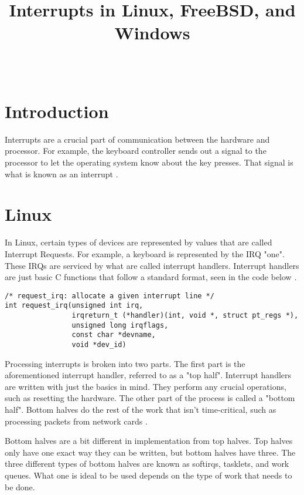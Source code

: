 \documentclass[10pt,draftclsnofoot,onecolumn,journal,compsoc]{IEEEtran}
\title{Interrupts in Linux, FreeBSD, and Windows}
\author{
  \IEEEauthorblockN{Heidi Clayton} \\
  \IEEEauthorblockA{CS 444: Operating Systems II Spring 2017 \\ Oregon State University}
}
\begin{document}
\maketitle
\newpage
\tableofcontents
\newpage
\section{Introduction}
Interrupts are a crucial part of communication between the hardware and processor. For example, the keyboard controller sends out a signal to the processor to let the operating system know about the key presses. That signal is what is known as an interrupt \cite{linux}.

\section{Linux}
 In Linux, certain types of devices are represented by values that are called Interrupt Requests. For example, a keyboard is represented by the IRQ "one". These IRQs are serviced by what are called interrupt handlers. Interrupt handlers are just basic C functions that follow a standard format, seen in the code below \cite{linux}.
 
\begin{lstlisting}[caption={The \textit{request\_irq} prototype in the linux/interrupt.h file. Note that the \textit{handler} parameter is a function pointer to the interrupt handler.}]
/* request_irq: allocate a given interrupt line */
int request_irq(unsigned int irq,
                irqreturn_t (*handler)(int, void *, struct pt_regs *),
                unsigned long irqflags,
                const char *devname,
                void *dev_id)
\end{lstlisting}
Processing interrupts is broken into two parts. The first part is the aforementioned interrupt handler, referred to as a "top half". Interrupt handlers are written with just the basics in mind. They perform any crucial operations, such as resetting the hardware. The other part of the process is called a "bottom half". Bottom halves do the rest of the work that isn't time-critical, such as processing packets from network cards \cite{linux}. 

Bottom halves are a bit different in implementation from top halves. Top halves only have one exact way they can be written, but bottom halves have three. The three different types of bottom halves are known as softirqs, tasklets, and work queues. What one is ideal to be used depends on the type of work that needs to be done. 
\end{document}
